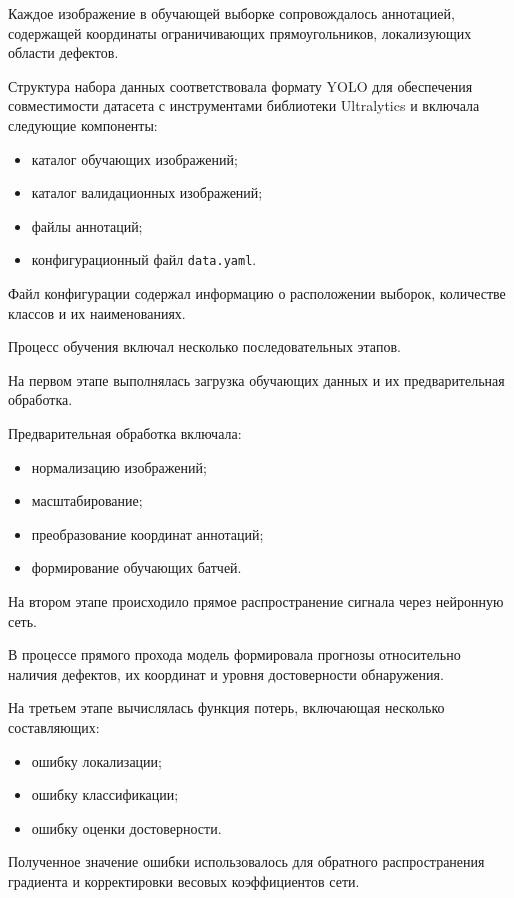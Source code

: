 Каждое изображение в обучающей выборке сопровождалось аннотацией, содержащей координаты ограничивающих прямоугольников, локализующих области дефектов.

Структура набора данных соответствовала формату YOLO для обеспечения совместимости датасета с инструментами библиотеки Ultralytics и включала следующие компоненты:

\begin{itemize}
	\item каталог обучающих изображений;
	\item каталог валидационных изображений;
	\item файлы аннотаций;
	\item конфигурационный файл \texttt{data.yaml}.
\end{itemize}

Файл конфигурации содержал информацию о расположении выборок, количестве классов и их наименованиях.

Процесс обучения включал несколько последовательных этапов.

На первом этапе выполнялась загрузка обучающих данных и их предварительная обработка.

Предварительная обработка включала:

\begin{itemize}
	\item нормализацию изображений;
	\item масштабирование;
	\item преобразование координат аннотаций;
	\item формирование обучающих батчей.
\end{itemize}

На втором этапе происходило прямое распространение сигнала через нейронную сеть.

В процессе прямого прохода модель формировала прогнозы относительно наличия дефектов, их координат и уровня достоверности обнаружения.

На третьем этапе вычислялась функция потерь, включающая несколько составляющих:

\begin{itemize}
	\item ошибку локализации;
	\item ошибку классификации;
	\item ошибку оценки достоверности.
\end{itemize}

Полученное значение ошибки использовалось для обратного распространения градиента и корректировки весовых коэффициентов сети.

